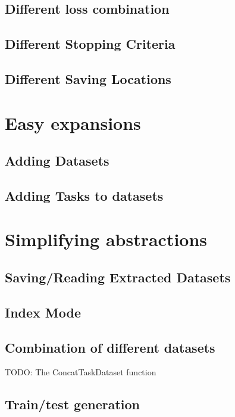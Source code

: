 \subsection{Different loss combination}

\subsection{Different Stopping Criteria}

\subsection{Different Saving Locations}

\section{Easy expansions}

\subsection{Adding Datasets}

\subsection{Adding Tasks to datasets}

\section{Simplifying abstractions}

\subsection{Saving/Reading Extracted Datasets}

\subsection{Index Mode}

\subsection{Combination of different datasets}
TODO: The ConcatTaskDataset function

\subsection{Train/test generation}

